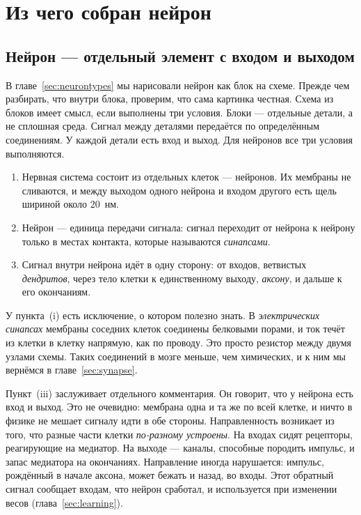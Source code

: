 \chapter{Из чего собран нейрон}
\label{sec:neuron}

\section{Нейрон --- отдельный элемент с входом и выходом}

В главе~\ref{sec:neurontypes} мы нарисовали нейрон как блок на схеме. Прежде чем разбирать, что внутри блока, проверим, что сама картинка честная. Схема из блоков имеет смысл, если выполнены три условия. Блоки --- отдельные детали, а не сплошная среда. Сигнал между деталями передаётся по определённым соединениям. У каждой детали есть вход и выход. Для нейронов все три условия выполняются.

\begin{keyblock}
\begin{proposition}
\label{prop:neurondoctrine}
\begin{enumerate}
\item[(i)] Нервная система состоит из отдельных клеток --- нейронов. Их мембраны не сливаются, и между выходом одного нейрона и входом другого есть щель шириной около $20$~нм.
\item[(ii)] Нейрон --- единица передачи сигнала: сигнал переходит от нейрона к нейрону только в местах контакта, которые называются \emph{синапсами}.
\item[(iii)] Сигнал внутри нейрона идёт в одну сторону: от входов, ветвистых \emph{дендритов}, через тело клетки к единственному выходу, \emph{аксону}, и дальше к его окончаниям.
\end{enumerate}
\end{proposition}
\end{keyblock}

У пункта~(i) есть исключение, о котором полезно знать. В \emph{электрических синапсах} мембраны соседних клеток соединены белковыми порами, и ток течёт из клетки в клетку напрямую, как по проводу. Это просто резистор между двумя узлами схемы. Таких соединений в мозге меньше, чем химических, и к ним мы вернёмся в главе~\ref{sec:synapse}.

Пункт~(iii) заслуживает отдельного комментария. Он говорит, что у нейрона есть вход и выход. Это не очевидно: мембрана одна и та же по всей клетке, и ничто в физике не мешает сигналу идти в обе стороны. Направленность возникает из того, что разные части клетки \emph{по-разному устроены}. На входах сидят рецепторы, реагирующие на медиатор. На выходе --- каналы, способные породить импульс, и запас медиатора на окончаниях. Направление иногда нарушается: импульс, рождённый в начале аксона, может бежать и назад, во входы. Этот обратный сигнал сообщает входам, что нейрон сработал, и используется при изменении весов (глава~\ref{sec:learning}).

